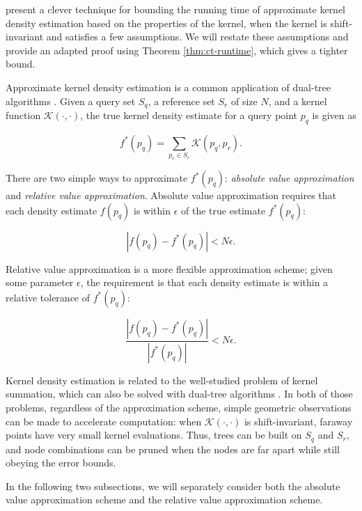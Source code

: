 \citet{ram2009} present a clever technique for bounding the
running time of approximate kernel density estimation based on the properties of
the kernel, when the kernel is shift-invariant and satisfies a few assumptions.
We will restate these assumptions and provide an adapted proof using Theorem
\ref{thm:ct-runtime}, which gives a tighter bound.

Approximate kernel density estimation is a common application of dual-tree
algorithms \citep{gray2003nonparametric, nbody}.  Given a query set $S_q$, a
reference set $S_r$ of size $N$, and a kernel function $\mathcal{K}(\cdot,
\cdot)$, the true kernel density estimate for a query point $p_q$ is given as

\begin{equation}
f^*(p_q) = \sum_{p_r \in S_r} \mathcal{K}(p_q, p_r).
\end{equation}

There are two simple ways to approximate $f^*(p_q)$: {\it absolute value
approximation} and {\it relative value approximation}.  Absolute value
approximation requires that each density estimate $f(p_q)$ is within $\epsilon$
of the true estimate $f^*(p_q)$:

\begin{equation}
| f(p_q) - f^*(p_q) | < N \epsilon.
\end{equation}

Relative value approximation is a more flexible approximation scheme; given some
parameter $\epsilon$, the requirement is that each density estimate is within a
relative tolerance of $f^*(p_q):$

\begin{equation}
\frac{| f(p_q) - f^*(p_q) |}{| f^*(p_q) |} < N \epsilon.
\end{equation}

Kernel density estimation is related to the well-studied problem of kernel
summation, which can also be solved with dual-tree algorithms
\citep{lee2006faster, lee2008fast}.  In both of those problems, regardless of
the approximation scheme, simple geometric observations can be made to
accelerate computation: when $\mathcal{K}(\cdot, \cdot)$ is shift-invariant,
faraway points have very small kernel evaluations.  Thus, trees can be built on
$S_q$ and $S_r$, and node combinations can be pruned when the nodes are far
apart while still obeying the error bounds.

In the following two subsections, we will separately consider both the absolute
value approximation scheme and the relative value approximation scheme.

